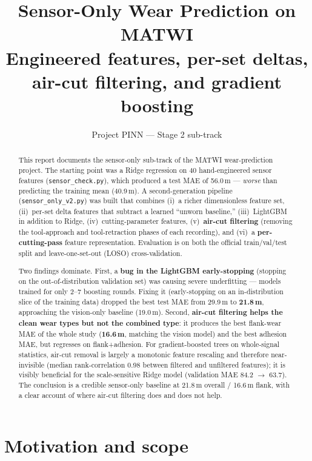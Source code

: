 \documentclass[11pt,a4paper]{article}
\title{Sensor-Only Wear Prediction on MATWI \\[2pt]
       \large Engineered features, per-set deltas, air-cut filtering,
       and gradient boosting}
\author{Project PINN --- Stage 2 sub-track}
\date{}
\newcommand{\code}[1]{\texttt{#1}}
\newcommand{\um}{\,\textmu m}
\begin{document}
\maketitle

\begin{abstract}
\noindent
This report documents the sensor-only sub-track of the MATWI wear-prediction
project. The starting point was a Ridge regression on 40 hand-engineered
sensor features (\code{sensor\_check.py}), which produced a test MAE of
56.0\um{} --- \emph{worse} than predicting the training mean (40.9\um). A
second-generation pipeline (\code{sensor\_only\_v2.py}) was built that combines
(i)~a richer dimensionless feature set, (ii)~per-set delta features that
subtract a learned ``unworn baseline,'' (iii)~LightGBM in addition to Ridge,
(iv)~cutting-parameter features, (v)~\textbf{air-cut filtering} (removing the
tool-approach and tool-retraction phases of each recording), and (vi)~a
\textbf{per-cutting-pass} feature representation. Evaluation is on both the
official train/val/test split and leave-one-set-out (LOSO) cross-validation.

Two findings dominate. First, a \textbf{bug in the LightGBM early-stopping}
(stopping on the out-of-distribution validation set) was causing severe
underfitting --- models trained for only 2--7 boosting rounds. Fixing it
(early-stopping on an in-distribution slice of the training data) dropped the
best test MAE from 29.9\um{} to \textbf{21.8\um}, approaching the vision-only
baseline (19.0\um). Second, \textbf{air-cut filtering helps the clean wear
types but not the combined type}: it produces the best flank-wear MAE of the
whole study (\textbf{16.6\um}, matching the vision model) and the best adhesion
MAE, but regresses on flank+adhesion. For gradient-boosted trees on
whole-signal statistics, air-cut removal is largely a monotonic feature
rescaling and therefore near-invisible (median rank-correlation 0.98 between
filtered and unfiltered features); it is visibly beneficial for the
scale-sensitive Ridge model (validation MAE 84.2 $\to$ 63.7). The conclusion
is a credible sensor-only baseline at 21.8\um{} overall / 16.6\um{} flank, with
a clear account of where air-cut filtering does and does not help.
\end{abstract}

\section{Motivation and scope}
\end{document}
